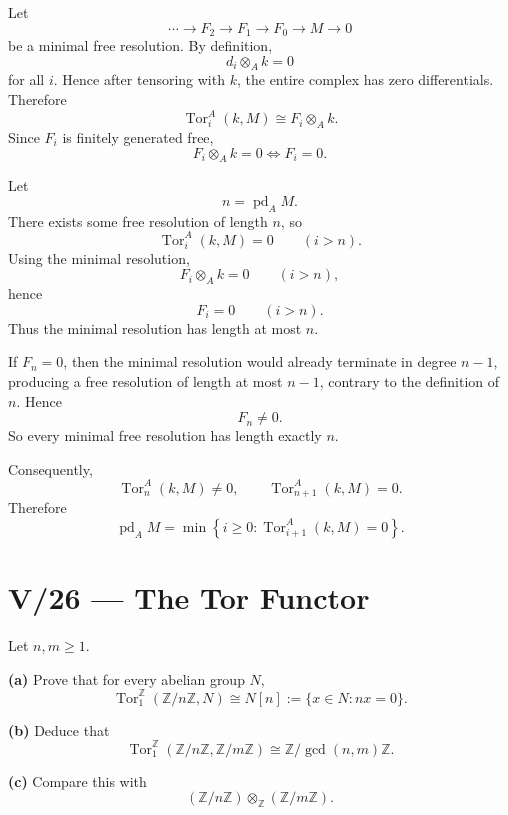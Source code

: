 \begin{solution}
Let
\[
\cdots\to F_2\to F_1\to F_0\to M\to0
\]
be a minimal free resolution. By definition,
\[
d_i\otimes_Ak=0
\]
for all \(i\). Hence after tensoring with \(k\), the entire complex has zero
differentials. Therefore
\[
\operatorname{Tor}_i^A(k,M)
\cong
F_i\otimes_Ak.
\]
Since \(F_i\) is finitely generated free,
\[
F_i\otimes_Ak=0
\iff
F_i=0.
\]

Let
\[
n=\operatorname{pd}_A M.
\]
There exists some free resolution of length \(n\), so
\[
\operatorname{Tor}_i^A(k,M)=0
\qquad(i>n).
\]
Using the minimal resolution,
\[
F_i\otimes_Ak=0
\qquad(i>n),
\]
hence
\[
F_i=0
\qquad(i>n).
\]
Thus the minimal resolution has length at most \(n\).

If \(F_n=0\), then the minimal resolution would already terminate in degree
\(n-1\), producing a free resolution of length at most \(n-1\), contrary to
the definition of \(n\). Hence
\[
F_n\ne0.
\]
So every minimal free resolution has length exactly \(n\).

Consequently,
\[
\operatorname{Tor}_n^A(k,M)\ne0,
\qquad
\operatorname{Tor}_{n+1}^A(k,M)=0.
\]
Therefore
\[
\operatorname{pd}_A M
=
\min\left\{
i\ge0:
\operatorname{Tor}_{i+1}^A(k,M)=0
\right\}.
\]
\end{solution}



\section*{V/26 --- The Tor Functor}

\begin{problem}[CP-V-0047]
\label{prob:cp-v-0047}
Let \(n,m\ge1\).

\textbf{(a)} Prove that for every abelian group \(N\),
\[
\operatorname{Tor}_1^{\mathbb Z}(\mathbb Z/n\mathbb Z,N)
\cong
N[n]
:=
\{x\in N:nx=0\}.
\]

\textbf{(b)} Deduce that
\[
\operatorname{Tor}_1^{\mathbb Z}
(\mathbb Z/n\mathbb Z,\mathbb Z/m\mathbb Z)
\cong
\mathbb Z/\gcd(n,m)\mathbb Z.
\]

\textbf{(c)} Compare this with
\[
(\mathbb Z/n\mathbb Z)\otimes_{\mathbb Z}
(\mathbb Z/m\mathbb Z).
\]
\end{problem}

